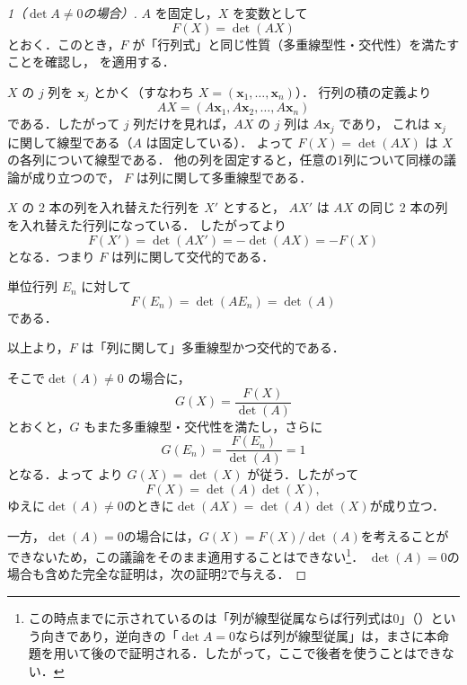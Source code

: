 \begin{leftbar}
\begin{proof}[1（$\det A \ne 0$の場合）]
  $A$ を固定し，$X$ を変数として
  \[
    F(X)=  \det(AX)
  \]
  とおく．このとき，$F$ が「行列式」と同じ性質（多重線型性・交代性）を満たすことを確認し，
  を適用する．


  $X$ の $j$ 列を $\bm{x}_j$ とかく（すなわち $X=(\bm{x}_1,\dots,\bm{x}_n)$）．
  行列の積の定義より
  \[
    AX=(A\bm{x}_1,A\bm{x}_2,\dots,A\bm{x}_n)
  \]
  である．したがって $j$ 列だけを見れば，$AX$ の $j$ 列は $A\bm{x}_j$ であり，
  これは $\bm{x}_j$ に関して線型である（$A$ は固定している）．
  よって $F(X)=\det(AX)$ は $X$ の各列について線型である．
他の列を固定すると，任意の1列について同様の議論が成り立つので，
$F$ は列に関して多重線型である．

  $X$ の 2 本の列を入れ替えた行列を $X'$ とすると，
  $AX'$ は $AX$ の同じ 2 本の列を入れ替えた行列になっている．
  したがってより
  \[
    F(X')=\det(AX')=-\det(AX)=-F(X)
  \]
  となる．つまり $F$ は列に関して交代的である．

  単位行列 $E_n$ に対して
  \[
    F(E_n)=\det(AE_n)=\det(A)
  \]
  である．

  以上より，$F$ は「列に関して」多重線型かつ交代的である．

  \smallskip
  そこで$\det(A) \ne 0$ の場合に，
  \[
    G(X) = \frac{F(X)}{\det(A)}
  \]
  とおくと，$G$ もまた多重線型・交代性を満たし，さらに
  \[
    G(E_n)=\frac{F(E_n)}{\det(A)}=1
  \]
  となる．よって より $G(X)=\det(X)$ が従う．したがって
  \[
    F(X)=\det(A)\det(X),
  \]
  ゆえに$\det (A) \ne 0$のときに$\det(AX)=\det(A)\det(X)$が成り立つ．

  \smallskip
  一方，$\det(A)=0$の場合には，$G(X)=F(X)/\det(A)$を考えることができないため，この議論をそのまま適用することはできない\footnote{この時点までに示されているのは「列が線型従属ならば行列式は$0$」（）という向きであり，逆向きの「$\det A = 0$ならば列が線型従属」は，まさに本命題を用いて後ので証明される．したがって，ここで後者を使うことはできない．}．
  $\det(A)=0$の場合も含めた完全な証明は，次の証明2で与える．
\end{proof}
\end{leftbar}


